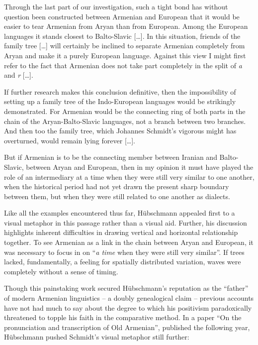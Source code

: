 \documentclass[output=paper]{langscibook}
\begin{document}
\begin{modquote}
Through the last part of our investigation, such a tight bond has without question been constructed between Armenian and European that it would be easier to tear Armenian from Aryan than from European. Among the European languages it stands closest to Balto-Slavic […]. In this situation, friends of the family tree […] will certainly be inclined to separate Armenian completely from Aryan and make it a purely European language. Against this view I might first refer to the fact that Armenian does not take part completely in the split of \emph{a} and \emph{r} […].

If further research makes this conclusion definitive, then the impossibility of setting up a family tree of the Indo-European languages would be strikingly demonstrated. For Armenian would be the connecting ring of both parts in the chain of the Aryan-Balto-Slavic languages, not a branch between two branches. And then too the family tree, which Johannes Schmidt's vigorous might has overturned, would remain lying forever […].

But if Armenian is to be the connecting member between Iranian and Balto-Slavic, between Aryan and European, then in my opinion it must have played the role of an intermediary at a time when they were still very similar to one another, when the historical period had not yet drawn the present sharp boundary between them, but when they were still related to one another as dialects. \citep[183]{Huebschmann1875}
\end{modquote}

Like all the examples encountered thus far, Hübschmann appealed first to a visual metaphor in this passage rather than a visual aid. Further, his discussion highlights inherent difficulties in drawing vertical and horizontal relationship together. To see Armenian as a link in the chain between Aryan and European, it was necessary to focus in on ``\emph{a time} when they were still very similar''. If trees lacked, fundamentally, a feeling for spatially distributed variation, waves were completely without a sense of timing.

Though this painstaking work secured Hübschmann's reputation as the ``father'' of modern Armenian linguistics -- a doubly genealogical claim -- previous accounts have not had much to say about the degree to which his positivism paradoxically threatened to topple his faith in the comparative method. In a paper ``On the pronunciation and transcription of Old Armenian'', published the following year, Hübschmann pushed Schmidt's visual metaphor still further:
\end{document}
